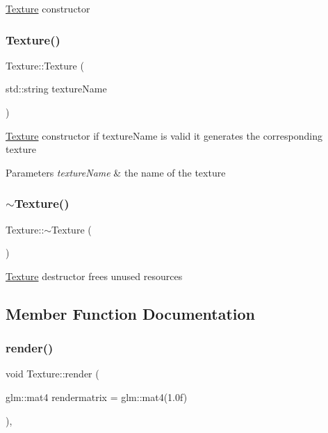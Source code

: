 \hyperlink{classTexture}{Texture} constructor \mbox{\label{classTexture_ae9b5167a274031b947316833d6fd4886}} 
\subsubsection{\texorpdfstring{Texture()}{Texture()}\hspace{0.1cm}{\footnotesize\ttfamily [2/2]}}
{\footnotesize\ttfamily Texture\+::\+Texture (\begin{DoxyParamCaption}\item[{std\+::string}]{texture\+Name }\end{DoxyParamCaption})}

\hyperlink{classTexture}{Texture} constructor if texture\+Name is valid it generates the corresponding texture 
\begin{DoxyParams}{Parameters}
{\em texture\+Name} & the name of the texture \\
\hline
\end{DoxyParams}
\mbox{\label{classTexture_a09c4bcb7462f64c1d20fa69dba3cee8a}} 
\subsubsection{\texorpdfstring{$\sim$\+Texture()}{~Texture()}}
{\footnotesize\ttfamily Texture\+::$\sim$\+Texture (\begin{DoxyParamCaption}{ }\end{DoxyParamCaption})\hspace{0.3cm}{\ttfamily [virtual]}}

\hyperlink{classTexture}{Texture} destructor frees unused resources 

\subsection{Member Function Documentation}
\mbox{\label{classTexture_a2771beaa1d538acddacc48d53bc75bdf}} 
\subsubsection{\texorpdfstring{render()}{render()}}
{\footnotesize\ttfamily void Texture\+::render (\begin{DoxyParamCaption}\item[{glm\+::mat4}]{rendermatrix = {\ttfamily glm\+:\+:mat4(1.0f)} }\end{DoxyParamCaption})\hspace{0.3cm}{\ttfamily [override]}, {\ttfamily [virtual]}}

